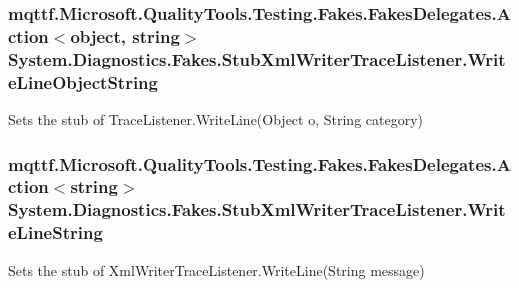 \hypertarget{class_system_1_1_diagnostics_1_1_fakes_1_1_stub_xml_writer_trace_listener_a4753c4bb60564f26795043341e6f80e1}{
\subsubsection[{Write\-Line\-Object\-String}]{\setlength{\rightskip}{0pt plus 5cm}mqttf.\-Microsoft.\-Quality\-Tools.\-Testing.\-Fakes.\-Fakes\-Delegates.\-Action$<$object, string$>$ System.\-Diagnostics.\-Fakes.\-Stub\-Xml\-Writer\-Trace\-Listener.\-Write\-Line\-Object\-String}}\label{class_system_1_1_diagnostics_1_1_fakes_1_1_stub_xml_writer_trace_listener_a4753c4bb60564f26795043341e6f80e1}


Sets the stub of Trace\-Listener.\-Write\-Line(\-Object o, String category)

\hypertarget{class_system_1_1_diagnostics_1_1_fakes_1_1_stub_xml_writer_trace_listener_a8c765b86d01246e18a6128ef8f4866f7}{
\subsubsection[{Write\-Line\-String}]{\setlength{\rightskip}{0pt plus 5cm}mqttf.\-Microsoft.\-Quality\-Tools.\-Testing.\-Fakes.\-Fakes\-Delegates.\-Action$<$string$>$ System.\-Diagnostics.\-Fakes.\-Stub\-Xml\-Writer\-Trace\-Listener.\-Write\-Line\-String}}\label{class_system_1_1_diagnostics_1_1_fakes_1_1_stub_xml_writer_trace_listener_a8c765b86d01246e18a6128ef8f4866f7}


Sets the stub of Xml\-Writer\-Trace\-Listener.\-Write\-Line(\-String message)

